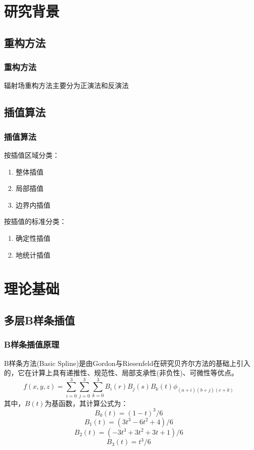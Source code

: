 \documentclass{beamer}
\begin{document}
\section{研究背景}

\subsection{重构方法}
\begin{frame}
    \frametitle{重构方法}
    辐射场重构方法主要分为正演法和反演法
\end{frame}

\subsection{插值算法}
\begin{frame}
    \frametitle{插值算法}
    按插值区域分类：
    \begin{enumerate}
        \item 整体插值
        \item 局部插值
        \item 边界内插值
    \end{enumerate}
    按插值的标准分类：
    \begin{enumerate}
        \item 确定性插值
        \item 地统计插值
    \end{enumerate}
\end{frame}

\section{理论基础}

\subsection{多层B样条插值}
\begin{frame}
    \frametitle{B样条插值原理}
    B样条方法(Basic Spline)是由Gordon与Riesenfeld在研究贝齐尔方法的基础上引入的，它在计算上具有递推性、规范性、局部支承性(非负性)、可微性等优点。
    \begin{equation}
        f(x,y,z)=\sum_{i=0}^{3}\sum_{j=0}^{3}\sum_{k=0}^{3}B_{i}(r)B_{j}(s)B_{k}(t) \phi_{(a+i)(b+j)(c+k)}
        \label{三次B样条插值函数}
    \end{equation}
    其中，$ B(t) $为基函数，其计算公式为：
    \begin{equation*}
        B_{0} \left( t \right) = \left( 1 - t \right)^{3} / 6
    \end{equation*}
    \begin{equation*}
        B_{1} \left( t \right) = \left( 3 t^{3} - 6 t^{2} + 4 \right) / 6
    \end{equation*}
    \begin{equation*}
        B_{2} \left( t \right) = \left( -3 t^{3} + 3 t^{2}  + 3 t + 1 \right) / 6
    \end{equation*}
    \begin{equation*}
        B_{3} \left( t \right) = t^{3} / 6
    \end{equation*}
\end{frame}
\end{document}
